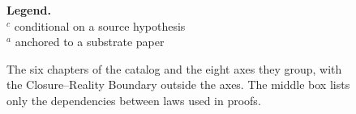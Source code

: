 \begin{figure}[t]
\vspace{0.75em}

\qquad
\begin{minipage}{0.31\linewidth}
\textbf{Legend.}\\
\(^{c}\) conditional on a source hypothesis\\
\(^{a}\) anchored to a substrate paper
\end{minipage}

\caption{The six chapters of the catalog and the eight axes they
group, with the Closure--Reality Boundary outside the axes.  The middle
box lists only the dependencies between laws used in proofs.}
\label{fig:axis-topology}
\end{figure}
